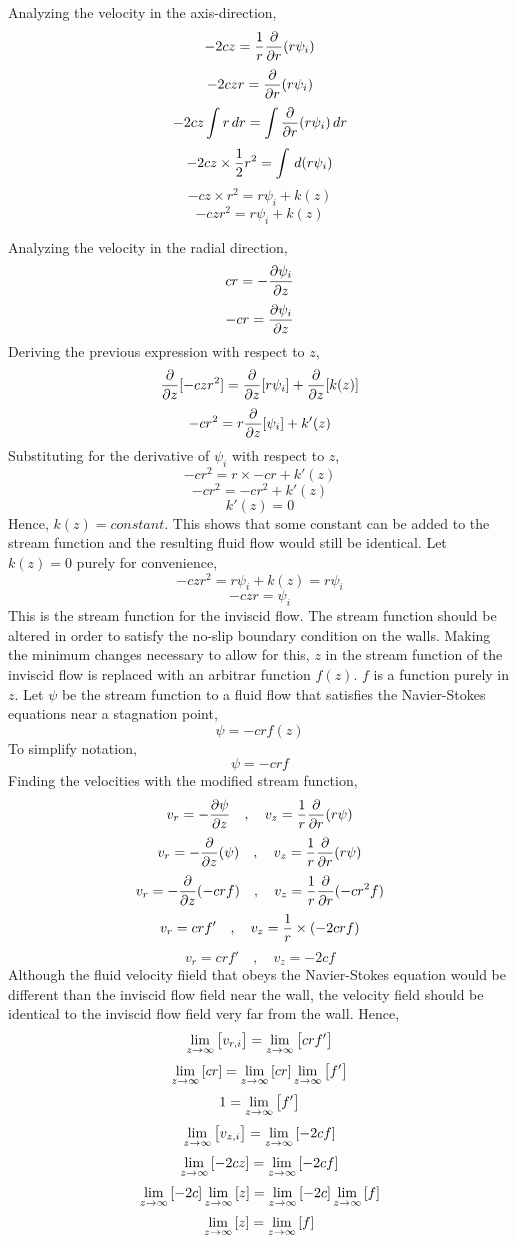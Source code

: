 \documentclass[class=report, 12pt, crop=false]{standalone}
\begin{document}
\begin{center}
Analyzing the velocity in the axis-direction,
$$-2cz = \frac{1}{r}\frac{\partial}{\partial r}(r\psi_i)$$
$$-2czr = \frac{\partial}{\partial r}(r\psi_i)$$
$$-2cz\int r\,dr = \int \frac{\partial}{\partial r}(r\psi_i)\,dr$$
$$-2cz\times \frac{1}{2}r^2 = \int \,d(r\psi_i)$$
$$-cz\times r^2 = r\psi_i + k(z)$$
$$-czr^2 = r\psi_i + k(z)$$

Analyzing the velocity in the radial direction,
$$cr =  -\frac{\partial \psi_i}{\partial z}$$
$$-cr =  \frac{\partial \psi_i}{\partial z}$$
Deriving the previous expression with respect to $z$,
$$\frac{\partial}{\partial z}[-czr^2] = \frac{\partial}{\partial z}[r\psi_i] + \frac{\partial}{\partial z}[k(z)]$$
$$-cr^2 = r\frac{\partial}{\partial z}[\psi_i] + k'(z)$$
Substituting for the derivative of $\psi_i$ with respect to $z$,
$$-cr^2 = r\times -cr + k'(z)$$
$$-cr^2 = -cr^2 + k'(z)$$
$$k'(z)=0$$
Hence, $k(z) = constant$. This shows that some constant can be added to the stream function and the resulting fluid flow would still be identical. Let $k(z)=0$ purely for convenience,
$$-czr^2 = r\psi_i + k(z) = r\psi_i$$
$$-czr = \psi_i$$
This is the stream function for the inviscid flow. The stream function should be altered in order to satisfy the no-slip boundary condition on the walls. Making the minimum changes necessary to allow for this, $z$ in the stream function of the inviscid flow is replaced with an arbitrar function $f(z)$. $f$ is a function purely in $z$. Let $\psi$ be the stream function to a fluid flow that satisfies the Navier-Stokes equations near a stagnation point,
$$\psi = -crf(z)$$
To simplify notation,
$$\psi = -crf$$
Finding the velocities with the modified stream function,
$$v_r =  -\frac{\partial \psi}{\partial z} \quad,\quad v_z = \frac{1}{r}\frac{\partial}{\partial r}(r\psi)$$
$$v_r =  -\frac{\partial}{\partial z}(\psi) \quad,\quad v_z = \frac{1}{r}\frac{\partial}{\partial r}(r\psi)$$
$$v_r =  -\frac{\partial}{\partial z}(-crf) \quad,\quad v_z = \frac{1}{r}\frac{\partial}{\partial r}(-cr^2f)$$
$$v_r =  crf' \quad,\quad v_z = \frac{1}{r}\times (-2crf)$$
$$v_r =  crf' \quad,\quad v_z = -2cf$$
Although the fluid velocity fiield that obeys the Navier-Stokes equation would be different than the inviscid flow field near the wall, the velocity field should be identical to the inviscid flow field very far from the wall. Hence, 
$$\lim_{z\to\infty}\left[v_{r,i}\right] =  \lim_{z\to\infty}\left[crf'\right]$$
$$\lim_{z\to\infty}\left[cr\right] =  \lim_{z\to\infty}\left[cr\right]\lim_{z\to\infty}\left[f'\right]$$
$$1 = \lim_{z\to\infty}\left[f'\right]$$
$$\lim_{z\to\infty}\left[v_{z,i}\right] = \lim_{z\to\infty}\left[-2cf\right]$$
$$\lim_{z\to\infty}\left[-2cz\right] = \lim_{z\to\infty}\left[-2cf\right]$$
$$\lim_{z\to\infty}\left[-2c\right]\lim_{z\to\infty}\left[z\right] = \lim_{z\to\infty}\left[-2c\right]\lim_{z\to\infty}\left[f\right]$$
$$\lim_{z\to\infty}\left[z\right] = \lim_{z\to\infty}\left[f\right]$$




\end{center}
\end{document}
